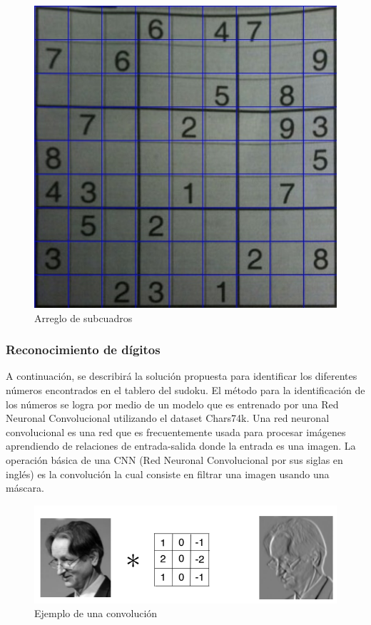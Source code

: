\documentclass{article}
\begin{document}
\begin{figure}[H]
\caption{Arreglo de subcuadros}
\centering
\includegraphics[width=.8\textwidth]{squares}
\end{figure}

\subsubsection{Reconocimiento de d\'igitos}
A continuaci\'on, se describir\'a la soluci\'on propuesta para identificar los diferentes n\'umeros encontrados en el tablero del sudoku.
El m\'etodo para la identificaci\'on de los n\'umeros se logra por medio de un modelo que es entrenado por una Red Neuronal Convolucional utilizando el dataset Chars74k. \break
Una red neuronal convolucional es una red que es frecuentemente usada para procesar im\'agenes aprendiendo de relaciones de entrada-salida donde la entrada es una imagen. La operaci\'on b\'asica de una CNN (Red Neuronal Convolucional por sus siglas en ingl\'es) es la convoluci\'on la cual consiste en filtrar una imagen usando una m\'ascara.
\begin{figure}[H]
  \caption{Ejemplo de una convoluci\'on}
  \centering
  \includegraphics[scale=.50]{convolution}
  \end{figure}
\end{document}
